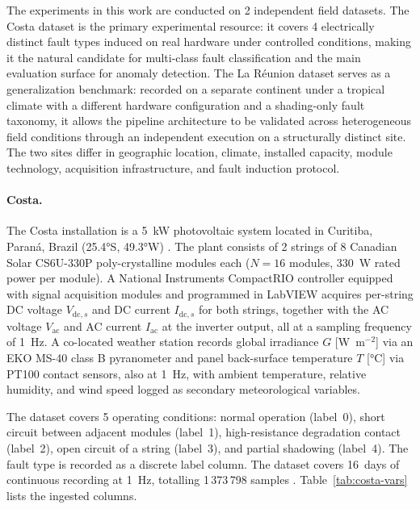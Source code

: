 The experiments in this work are conducted on 2 independent field datasets. The Costa dataset \citep{costa2020sensors} is the primary experimental resource: it covers 4 electrically distinct fault types induced on real hardware under controlled conditions, making it the natural candidate for multi-class fault classification and the main evaluation surface for anomaly detection. The La Réunion dataset \citep{graillet2023dib} serves as a generalization benchmark: recorded on a separate continent under a tropical climate with a different hardware configuration and a shading-only fault taxonomy, it allows the pipeline architecture to be validated across heterogeneous field conditions through an independent execution on a structurally distinct site. The two sites differ in geographic location, climate, installed capacity, module technology, acquisition infrastructure, and fault induction protocol.

\paragraph{Costa.}
The Costa installation is a 5~kW photovoltaic system located in Curitiba, Paraná, Brazil (25.4°S, 49.3°W) \citep{costa2020sensors}. The plant consists of 2 strings of 8 Canadian Solar CS6U-330P poly-crystalline modules each ($N = 16$ modules, 330~W rated power per module). A National Instruments CompactRIO controller equipped with signal acquisition modules and programmed in LabVIEW acquires per-string DC voltage $V_{\mathrm{dc},s}$ and DC current $I_{\mathrm{dc},s}$ for both strings, together with the AC voltage $V_{\mathrm{ac}}$ and AC current $I_{\mathrm{ac}}$ at the inverter output, all at a sampling frequency of 1~Hz. A co-located weather station records global irradiance $G$ [W~m$^{-2}$] via an EKO MS-40 class B pyranometer and panel back-surface temperature $T$ [°C] via PT100 contact sensors, also at 1~Hz, with ambient temperature, relative humidity, and wind speed logged as secondary meteorological variables.

The dataset covers 5 operating conditions: normal operation (label~0), short circuit between adjacent modules (label~1), high-resistance degradation contact (label~2), open circuit of a string (label~3), and partial shadowing (label~4). The fault type is recorded as a discrete label column. The dataset covers 16~days of continuous recording at 1~Hz, totalling 1\,373\,798 samples \citep{costa2020sensors}. Table~\ref{tab:costa-vars} lists the ingested columns.

